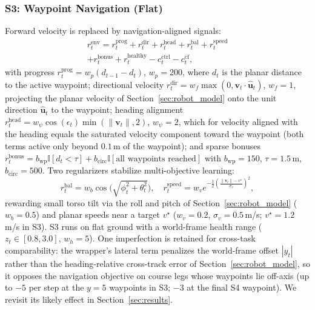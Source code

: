 \documentclass[conference,a4paper]{IEEEtran}
\begin{document}
\subsubsection{S3: Waypoint Navigation (Flat)} Forward velocity is replaced by navigation-aligned signals:
\begin{multline}
\label{eq:s3_reward}
r_t^{\mathrm{env}} = r_t^{\mathrm{prog}} + r_t^{\mathrm{dir}} + r_t^{\mathrm{head}} + r_t^{\mathrm{bal}} + r_t^{\mathrm{speed}} \\ + r_t^{\mathrm{bonus}} + r_t^{\mathrm{healthy}} - c_t^{\mathrm{ctrl}} - c_t^{\mathrm{cf}},
\end{multline}
with progress $r_t^{\mathrm{prog}} = w_p (d_{t-1} - d_t)$, $w_p = 200$, where $d_t$ is the planar distance to the active waypoint; directional velocity $r_t^{\mathrm{dir}} = w_f \max(0, \mathbf{v}_t \!\cdot\! \hat{\mathbf{u}}_t)$, $w_f = 1$, projecting the planar velocity of Section~\ref{sec:robot_model} onto the unit direction $\hat{\mathbf{u}}_t$ to the waypoint; heading alignment $r_t^{\mathrm{head}} = w_\psi \cos(\epsilon_t) \min(\lVert\mathbf{v}_t\rVert, 2)$, $w_\psi = 2$, which for velocity aligned with the heading equals the saturated velocity component toward the waypoint (both terms active only beyond $0.1$\,m of the waypoint); and sparse bonuses $r_t^{\mathrm{bonus}} = b_{\mathrm{wp}} \mathbb{I}[d_t < \tau] + b_{\mathrm{circ}} \mathbb{I}[\text{all waypoints reached}]$ with $b_{\mathrm{wp}} = 150$, $\tau = 1.5$\,m, $b_{\mathrm{circ}} = 500$. Two regularizers stabilize multi-objective learning:
\begin{equation}
\label{eq:s3_balance_speed}
r_t^{\mathrm{bal}} = w_b \cos\!\Big(\sqrt{\phi_t^2 + \theta_t^2}\Big), \quad
r_t^{\mathrm{speed}} = w_v e^{-\frac{1}{2}\left(\frac{\lVert\mathbf{v}_t\rVert - v^\star}{\sigma_v}\right)^2},
\end{equation}
rewarding small torso tilt via the roll and pitch of Section~\ref{sec:robot_model} ($w_b = 0.5$) and planar speeds near a target $v^\star$ ($w_v = 0.2$, $\sigma_v = 0.5$\,m/s; $v^\star = 1.2$\,m/s in S3). S3 runs on flat ground with a world-frame health range ($z_t \in [0.8, 3.0]$, $w_h = 5$). One imperfection is retained for cross-task comparability: the wrapper's lateral term penalizes the world-frame offset $|y_t|$ rather than the heading-relative cross-track error of Section~\ref{sec:robot_model}, so it opposes the navigation objective on course legs whose waypoints lie off-axis (up to $-5$ per step at the $y{=}5$ waypoints in S3; $-3$ at the final S4 waypoint). We revisit its likely effect in Section~\ref{sec:results}.
\end{document}

